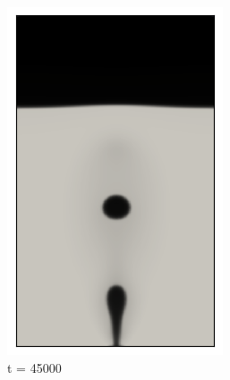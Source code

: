 \begin{figure}[H]
\begin{subfigure}{0.25\textwidth}
		\includegraphics[width=\linewidth]{figs/cap4/bb_760_d45}
		\caption{t = 45000}
		\label{fig:8}
	\end{subfigure}\hfil 
	\begin{subfigure}{0.25\textwidth}

\end{subfigure}
\end{figure}
